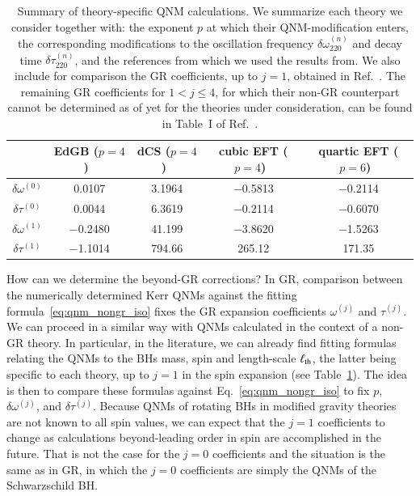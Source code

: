 \documentclass[twocolumn,
               prd,
               aps,
               superscriptaddress,
               tightenlines,
               nofootinbib,
               eqsecnum,
               amsfonts,
               amsmath,
               longbibliography]{revtex4-1}
\begin{document}
\begin{table}[t]
\quad
\begin{tabular}{c | c  c  c  c}
\hline
\hline
                              & EdGB ($p=4$)~\cite{Blazquez-Salcedo:2016enn,Pierini:2021jxd} & dCS ($p=4$)~\cite{Wagle:2021tam} & cubic EFT ($p=4$)~\cite{Cano:2021myl} & quartic EFT ($p=6$)~\cite{Cano:2021myl} \\
\hline
$\delta\omega^{(0)}$    & 0.0107                                               & 3.1964                   & $-$0.5813                     & $-$0.2114                       \\
$\delta\tau^{(0)}$      & 0.0044                                               & 6.3619                   & $-$0.2114                     & $-$0.6070                       \\
$\delta\omega^{(1)}$    & $-$0.2480                                            & 41.199                   & $-$3.8620                     & $-$1.5263                       \\
$\delta\tau^{(1)}$      & $-$1.1014                                            & 794.66                   & 265.12                        & 171.35                          \\
\hline
\hline
\end{tabular}
\caption{Summary of theory-specific QNM calculations.
%
We summarize each theory we consider together with: the exponent $p$ at
which their QNM-modification enters, the corresponding modifications to the
oscillation frequency $\delta \omega^{(n)}_{220}$ and decay time $\delta \tau^{(n)}_{220}$, and the
references from which we used the results from.
%
We also include for comparison the GR coefficients, up to $j=1$, obtained in Ref.~\cite{Maselli:2019mjd}.
%
The remaining GR coefficients for $1< j \leqslant 4$, for which their non-GR counterpart cannot be determined as of yet for
the theories under consideration, can be found in Table~I of Ref.~\cite{Maselli:2019mjd}.
%
}
\label{tab:ref_theories_qnms}
\end{table}

How can we determine the beyond-GR corrections? In GR, comparison between the numerically determined
Kerr QNMs against the fitting formula~\eqref{eq:qnm_nongr_iso} fixes the GR expansion coefficients
$\omega^{(j)}$ and $\tau^{(j)}$.
%
We can proceed in a similar way with QNMs calculated in the context of a non-GR theory.
%
In particular, in the literature, we can already find fitting formulas relating
the QNMs to the BHs mass, spin and length-scale $\ell_{\rm th}$, the latter being
specific to each theory, up to $j=1$ in the spin expansion (see Table~\ref{tab:ref_theories_qnms}).
%
The idea is then to compare these formulas against Eq.~\eqref{eq:qnm_nongr_iso}
to fix $p$, $\delta\omega^{(j)}$, and $\delta\tau^{(j)}$.
%
Because QNMs of rotating BHs in modified gravity theories are not known to
all spin values, we can expect that the $j=1$ coefficients to change as
calculations beyond-leading order in spin are accomplished in the future.
%
That is not the case for the $j=0$ coefficients and the situation is the same as in GR,
in which the $j=0$ coefficients are simply the QNMs of the Schwarzschild BH.
\end{document}
